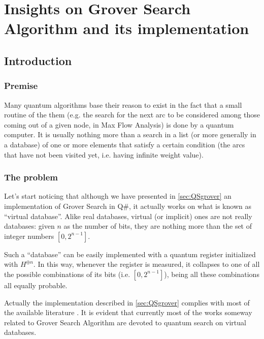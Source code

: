 
\chapter{Insights on Grover Search Algorithm and its implementation}
\label{chp:grover}

\section{Introduction}

\subsection{Premise}

Many quantum algorithms base their reason to exist in the fact that a small routine of the them (e.g. the search for the next arc to be considered among those coming out of a given node, in Max Flow Analysis) is done by a quantum computer. It is usually nothing more than a search in a list (or more generally in a database) of one or more elements that satisfy a certain condition (the arcs that have not been visited yet, i.e. having infinite weight value).

\subsection{The problem}

Let's start noticing that although we have presented in \cref{sec:QSgrover} an implementation of Grover Search in Q\#, it actually works on what is known as ``virtual database''. Alike real databases, virtual (or implicit) ones are not really databases: given $n$ as the number of bits, they are nothing more than the set of integer numbers $\left[0, 2^{n-1}\right]$.

Such a ``database'' can be easily implemented with a quantum register initialized with $H^{\oplus n}$. In this way, whenever the register is measured, it collapses to one of all the possible combinations of its bits (i.e. $\left[0, 2^{n-1}\right]$), being all these combinations all equally probable.

\bigskip

Actually the implementation described in \cref{sec:QSgrover} complies with most of the available literature \cite{Grover:1996:FQM:237814.237866, lavor2003grover}. It is evident that currently most of the works someway related to Grover Search Algorithm are devoted to quantum search on virtual databases. \cite{Broda2016}

